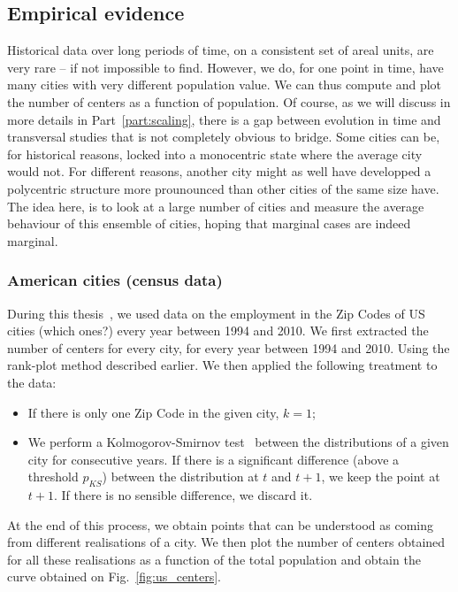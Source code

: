 \subsection{Empirical evidence}
\label{sub:empirical_evidence}

Historical data over long periods of time, on a consistent set of areal units,
are very rare -- if not impossible to find. However, we do, for one point in
time, have many cities with very different population value. We can thus compute
and plot the number of centers as a function of population. Of course, as we
will discuss in more details in Part~\ref{part:scaling}, there is a gap between
evolution in time and transversal studies that is not completely obvious to
bridge.  Some cities can be, for historical reasons, locked into a monocentric
state where the average city would not. For different reasons, another city
might as well have developped a polycentric structure more prounounced than
other cities of the same size have. The idea here, is to look at a large number
of cities and measure the average behaviour of this ensemble of cities, hoping
that marginal cases are indeed marginal.


\subsubsection{American cities (census data)}
\label{ssub:american_cities_census_data_}

During this thesis~\cite{louf:2013_polycentric}, we used data on the employment in the Zip Codes of US cities
(which ones?) every year between 1994 and 2010. We first extracted the number of
centers for every city, for every year between 1994 and 2010. Using the
rank-plot method described earlier. We then applied the following treatment to
the data:

\begin{itemize}
    \item If there is only one Zip Code in the given city, $k=1$;
    \item We perform a Kolmogorov-Smirnov test~\cite{Massey:1951} between the
        distributions of a given city for consecutive years. If there is a
        significant difference (above a threshold $p_{KS}$) between the
        distribution at $t$ and $t+1$, we keep the point at $t+1$. If there is
        no sensible difference, we discard it.
\end{itemize}

At the end of this process, we obtain points that can be understood as coming
from different realisations of a city. We then plot the number of centers
obtained for all these realisations as a function of the total population and
obtain the curve obtained on Fig.~\ref{fig:us_centers}.

